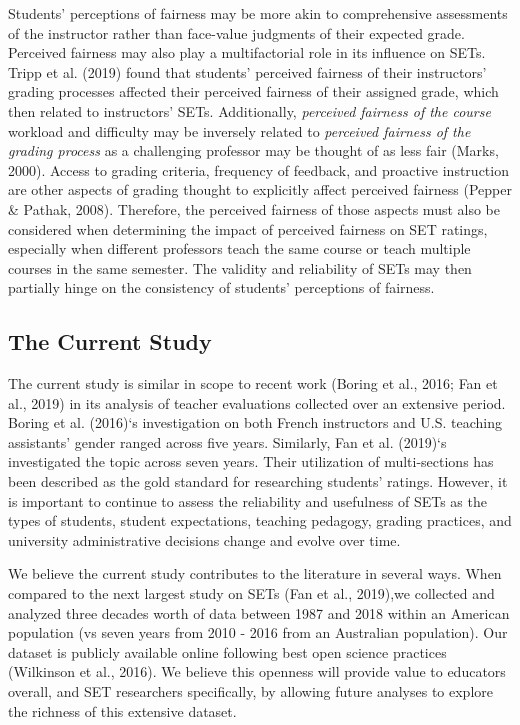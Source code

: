 \documentclass[
  man,mask]{apa7}
\begin{document}
Students' perceptions of fairness may be more akin to comprehensive assessments of the instructor rather than face-value judgments of their expected grade. Perceived fairness may also play a multifactorial role in its influence on SETs. Tripp et al. (2019) found that students' perceived fairness of their instructors' grading processes affected their perceived fairness of their assigned grade, which then related to instructors' SETs. Additionally, \emph{perceived fairness of the course} workload and difficulty may be inversely related to \emph{perceived fairness of the grading process} as a challenging professor may be thought of as less fair (Marks, 2000). Access to grading criteria, frequency of feedback, and proactive instruction are other aspects of grading thought to explicitly affect perceived fairness (Pepper \& Pathak, 2008). Therefore, the perceived fairness of those aspects must also be considered when determining the impact of perceived fairness on SET ratings, especially when different professors teach the same course or teach multiple courses in the same semester. The validity and reliability of SETs may then partially hinge on the consistency of students' perceptions of fairness.

\subsection{The Current Study}\label{the-current-study}

The current study is similar in scope to recent work (Boring et al., 2016; Fan et al., 2019) in its analysis of teacher evaluations collected over an
extensive period. Boring et al. (2016)`s investigation on both French instructors
and U.S. teaching assistants' gender ranged across five years.
Similarly, Fan et al. (2019)`s investigated the topic across seven years. Their
utilization of multi-sections has been described as the gold standard
for researching students' ratings. However, it is important to continue
to assess the reliability and usefulness of SETs as the types of
students, student expectations, teaching pedagogy, grading practices,
and university administrative decisions change and evolve over time.

We believe the current study contributes to the literature in several
ways. When compared to the next largest study on SETs (Fan et al., 2019),we collected and analyzed three decades worth of data between 1987 and 2018 within an American population (vs seven years from 2010 - 2016 from an Australian population). Our dataset is publicly available online following best open science practices (Wilkinson et al., 2016). We believe this openness will provide value to educators
overall, and SET researchers specifically, by allowing future analyses to
explore the richness of this extensive dataset.
\end{document}
